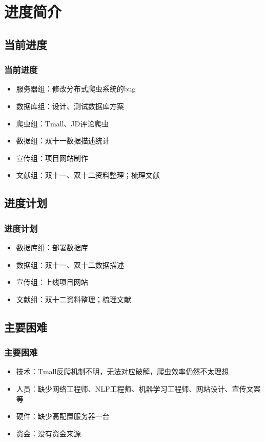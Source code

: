 \documentclass{beamer}
\begin{document}
\section{进度简介}
\subsection{当前进度}
\begin{frame}
\frametitle{当前进度}
\begin{itemize}
  \item 服务器组：修改分布式爬虫系统的bug
  \item 数据库组：设计、测试数据库方案
  \item 爬虫组：Tmall、JD评论爬虫
  \item 数据组：双十一数据描述统计
  \item 宣传组：项目网站制作
  \item 文献组：双十一、双十二资料整理；梳理文献
\end{itemize}
\end{frame}

\subsection{进度计划}
\begin{frame}
\frametitle{进度计划}
\begin{itemize}
  \item 数据库组：部署数据库
  \item 数据组：双十一、双十二数据描述
  \item 宣传组：上线项目网站
  \item 文献组：双十二资料整理；梳理文献
\end{itemize}
\end{frame}

\subsection{主要困难}
\begin{frame}
\frametitle{主要困难}
\begin{itemize}
  \item 技术：Tmall反爬机制不明，无法对应破解，爬虫效率仍然不太理想
  \item 人员：缺少网络工程师、NLP工程师、机器学习工程师、网站设计、宣传文案等
  \item 硬件：缺少高配置服务器一台
  \item 资金：没有资金来源
\end{itemize}
\end{frame}
\end{document}
